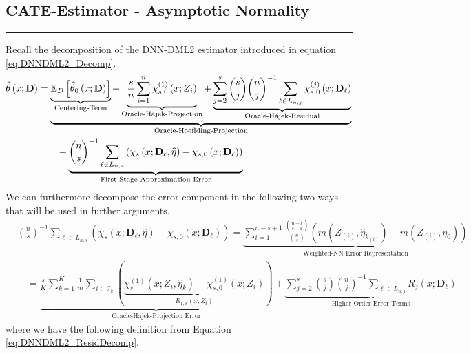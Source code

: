 \subsection{CATE-Estimator - Asymptotic Normality}
\hrule
Recall the decomposition of the DNN-DML2 estimator introduced in equation \ref{eq:DNNDML2_Decomp}.
\begin{equation}
    \begin{aligned}
        \widehat{\theta}\left(x; \mathbf{D}\right)
        & = \underbrace{\underbrace{\mathbb{E}_{D}\left[\widehat{\theta}_{0}\left(x; \mathbf{D}\right)\right]}_{\text{Centering-Term}}
        + \underbrace{\frac{s}{n}\sum_{i = 1}^{n} \chi_{s,0}^{(1)}\left(x; Z_{i}\right)}_{\text{Oracle-H\'ajek-Projection}}
        + \underbrace{\sum_{j = 2}^{s} \binom{s}{j} \binom{n}{j}^{-1}\sum_{\ell \in L_{n,j}} \chi_{s,0}^{(j)}\left(x; \mathbf{D}_{\ell}\right)}_{\text{Oracle-H\'ajek-Residual}}}_{\text{Oracle-Hoeffding-Projection}}\\
        & \quad \quad + \underbrace{\binom{n}{s}^{-1}\sum_{\ell \in L_{n,s}}\left(\chi_{s}\left(x; \mathbf{D}_{\ell}, \widehat{\eta}\right) - \chi_{s,0}\left(x; \mathbf{D}_{\ell}\right)\right)}_{\text{First-Stage Approximation Error}}
    \end{aligned}
\end{equation}
We can furthermore decompose the error component in the following two ways that will be used in further arguments.
\begin{equation}
    \begin{aligned}
        & \binom{n}{s}^{-1} \sum_{\ell \in L_{n,s}}\left(\chi_{s}\left(x; \mathbf{D}_{\ell}, \hat{\eta}\right) - \chi_{s,0}\left(x; \mathbf{D}_{\ell}\right)\right)
        = \underbrace{\sum_{i = 1}^{n - s + 1} \frac{\binom{n-i}{s-1}}{\binom{n}{s}} \left(m(Z_{(i)}, \hat{\eta}_{k_{(i)}}) - m(Z_{(i)}, \eta_{0})\right)}_{\text{Weighted-NN Error Representation}} \\
        & \quad = \underbrace{\frac{s}{K} \sum_{k = 1}^{K} \frac{1}{m} \sum_{i \in \mathcal{I}_{k}}\left(\underbrace{\chi_{s}^{(1)}\left(x; Z_{i}, \hat{\eta}_{k}\right) - \chi_{s,0}^{(1)}\left(x; Z_{i}\right)}_{R_{1,k}\left(x; Z_{i}\right)}\right)}_{\text{Oracle-H\'ajek-Projection Error}}
         + \underbrace{\sum_{j = 2}^{s} \binom{s}{j} \binom{n}{j}^{-1}\sum_{\ell \in L_{n,j}} R_{j}\left(x; \mathbf{D}_{\ell}\right)}_{\text{Higher-Order Error Terms}}
    \end{aligned}
\end{equation}
where we have the following definition from Equation \ref{eq:DNNDML2_ResidDecomp}.

